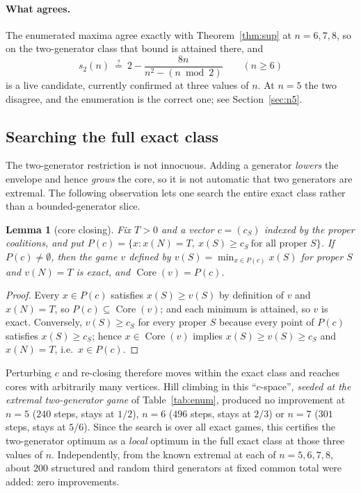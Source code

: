 \documentclass[11pt]{article}
\newtheorem{lemma}[theorem]{Lemma}
\newcommand{\core}{\operatorname{Core}}
\begin{document}
\paragraph{What agrees.}
The enumerated maxima agree exactly with Theorem~\ref{thm:sup} at $n=6,7,8$,
so on the two-generator class that bound is attained there, and
\[
 s_2(n)\ \stackrel{?}{=}\ 2-\frac{8n}{n^2-(n\bmod2)}\qquad(n\ge6)
\]
is a live candidate, currently confirmed at three values of $n$.  At $n=5$
the two disagree, and the enumeration is the correct one; see
Section~\ref{sec:n5}.

\subsection{Searching the full exact class}

The two-generator restriction is not innocuous.  Adding a generator
\emph{lowers} the envelope and hence \emph{grows} the core, so it is not
automatic that two generators are extremal.  The following observation lets
one search the entire exact class rather than a bounded-generator slice.

\begin{lemma}[core closing]\label{lem:closing}
Fix $T>0$ and a vector $c=(c_S)$ indexed by the proper coalitions, and put
$P(c)=\{x: x(N)=T,\ x(S)\ge c_S\ \text{for all proper }S\}$.  If
$P(c)\ne\emptyset$, then the game $v$ defined by $v(S)=\min_{x\in P(c)}x(S)$
for proper $S$ and $v(N)=T$ is exact, and $\core(v)=P(c)$.
\end{lemma}

\begin{proof}
Every $x\in P(c)$ satisfies $x(S)\ge v(S)$ by definition of $v$ and
$x(N)=T$, so $P(c)\subseteq\core(v)$; and each minimum is attained, so $v$ is
exact.  Conversely, $v(S)\ge c_S$ for every proper $S$ because every point of
$P(c)$ satisfies $x(S)\ge c_S$; hence $x\in\core(v)$ implies $x(S)\ge
v(S)\ge c_S$ and $x(N)=T$, i.e.\ $x\in P(c)$.
\end{proof}

Perturbing $c$ and re-closing therefore moves within the exact class and
reaches cores with arbitrarily many vertices.  Hill climbing in this
``$c$-space'', \emph{seeded at the extremal two-generator game} of
Table~\ref{tab:enum}, produced no improvement at $n=5$ ($240$ steps, stays at
$1/2$), $n=6$ ($496$ steps, stays at $2/3$) or $n=7$ ($301$ steps, stays at
$5/6$).  Since the search is over all exact games, this certifies the
two-generator optimum as a \emph{local} optimum in the full exact class at
those three values of $n$.  Independently, from the known extremal at each of
$n=5,6,7,8$, about $200$ structured and random third generators at fixed
common total were added: zero improvements.
\end{document}
